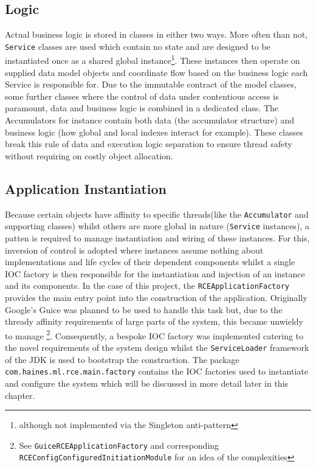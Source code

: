 \documentclass[a4paper,11pt]{scrreprt}
\begin{document}
\subsection{Logic}
Actual business logic is stored in classes in either two ways. More often than not, \verb|Service| classes are used which contain no state and are designed to be instantiated once as a shared global instance\footnote{although not implemented via the Singleton anti-pattern}. These instances then operate on supplied data model objects and coordinate flow based on the business logic each Service is responsible for. Due to the immutable contract of the model classes, some further classes where the control of data under contentious access is paramount, data and business logic is combined in a dedicated class. The Accumulators for instance contain both data (the accumulator structure) and business logic (how global and local indexes interact for example). These classes break this rule of data and execution logic separation to ensure thread safety without requiring on costly object allocation. 
\subsection{Application Instantiation}
Because certain objects have affinity to specific threads(like the \verb|Accumulator| and supporting classes) whilst others are more global in nature (\verb|Service| instances), a patten is required to manage instantiation and wiring of these instances. For this, inversion of control\cite{ioc} is adopted where instances assume nothing about implementations and life cycles of their dependent components whilst a single IOC factory is then responsible for the instantiation and injection of an instance and its components. In the case of this project, the \verb|RCEApplicationFactory| provides the main entry point into the construction of the application. Originally Google's Guice\cite{guice} was planned to be used to handle this task but, due to the thready affinity requirements of large parts of the system, this became unwieldy to manage \footnote{See \verb|GuiceRCEApplicationFactory| and corresponding \verb|RCEConfigConfiguredInitiationModule| for an idea of the complexities}. Consequently, a bespoke IOC factory was implemented catering to the novel requirements of the system design whilst the \verb|ServiceLoader| framework of the JDK is used to bootstrap the construction. The package \verb|com.haines.ml.rce.main.factory| contains the IOC factories used to instantiate and configure the system which will be discussed in more detail later in this chapter.
\end{document}

